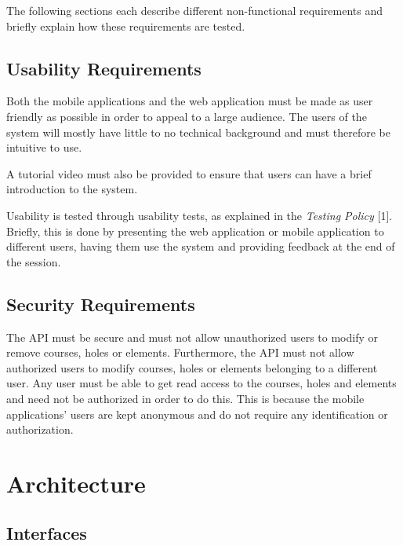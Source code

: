 \documentclass{article}
\begin{document}
    The following sections each describe different non-functional requirements
    and briefly explain how these requirements are tested.

    \subsection{Usability Requirements}

    Both the mobile applications and the web application must be made as user
    friendly as possible in order to appeal to a large audience. The users of
    the system will mostly have little to no technical background and must
    therefore be intuitive to use.

    A tutorial video must also be provided to ensure that users can have a brief
    introduction to the system.

    Usability is tested through usability tests, as explained in the
    \textit{Testing Policy} [1]. Briefly, this is done by presenting the web
    application or mobile application to different users, having them use the
    system and providing feedback at the end of the session.

    \subsection{Security Requirements}

    The API must be secure and must not allow unauthorized users to modify or
    remove courses, holes or elements. Furthermore, the API must not allow
    authorized users to modify courses, holes or elements belonging to a
    different user. Any user must be able to get read access to the courses,
    holes and elements and need not be authorized in order to do this. This is
    because the mobile applications' users are kept anonymous and do not
    require any identification or authorization.

    \newpage


    \section{Architecture}

    \subsection{Interfaces}
\end{document}
